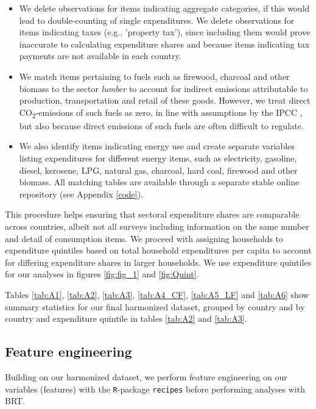 \documentclass[12pt, a4paper]{article}
\begin{document}
\begin{refsection}
\begin{itemize}
    \item We delete observations for items indicating aggregate categories, if this would lead to double-counting of single expenditures. We delete observations for items indicating taxes (e.g., 'property tax'), since including them would prove inaccurate to calculating expenditure shares and because items indicating tax payments are not available in each country.
    \item We match items pertaining to fuels such as firewood, charcoal and other biomass to the sector \textit{lumber} to account for indirect emissions attributable to production, transportation and retail of these goods. However, we treat direct CO\textsubscript{2}-emissions of such fuels as zero, in line with assumptions by the IPCC \autocite{Grad.2023}, but also because direct emissions of such fuels are often difficult to regulate.
    \item We also identify items indicating energy use and create separate variables listing expenditures for different energy items, such as electricity, gasoline, diesel, kerosene, LPG, natural gas, charcoal, hard coal, firewood and other biomass. All matching tables are available through a separate stable online repository (see Appendix \ref{code}).
\end{itemize}

This procedure helps ensuring that sectoral expenditure shares are comparable across countries, albeit not all surveys including information on the same number and detail of consumption items. We proceed with assigning households to expenditure quintiles based on total household expenditures per capita to account for differing expenditure shares in larger households. We use expenditure quintiles for our analyses in figures \ref{fig:fig_1} and \ref{fig:Quint}.

Tables \ref{tab:A1}, \ref{tab:A2}, \ref{tab:A3}, \ref{tab:A4_CF}, \ref{tab:A5_LF} and \ref{tab:A6} show summary statistics for our final harmonized dataset, grouped by country and by country and expenditure quintile in tables \ref{tab:A2} and \ref{tab:A3}. 


\subsection{Feature engineering} \label{sec:featureengineering}

Building on our harmonized dataset, we perform feature engineering on our variables (features) with the \texttt{R}-package \texttt{recipes} before performing analyses with BRT.


\end{refsection}
\end{document}
